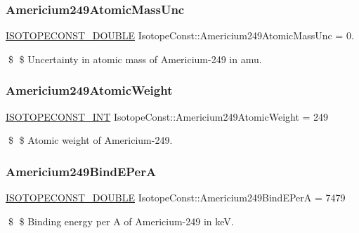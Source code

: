 \subsubsection{\texorpdfstring{Americium249\+Atomic\+Mass\+Unc}{Americium249AtomicMassUnc}}
{\footnotesize\ttfamily \mbox{\hyperlink{group___isotope_const-_macros_ga8f45a7272ce02c0b4c65c44636ed719a}{I\+S\+O\+T\+O\+P\+E\+C\+O\+N\+S\+T\+\_\+\+D\+O\+U\+B\+LE}} Isotope\+Const\+::\+Americium249\+Atomic\+Mass\+Unc = 0.}

\$ \$ Uncertainty in atomic mass of Americium-\/249 in amu. \mbox{\label{group___isotope_const-_americium-_am249_ga90484d532dc5cfd1f79ecb9f25460d8e}} 
\subsubsection{\texorpdfstring{Americium249\+Atomic\+Weight}{Americium249AtomicWeight}}
{\footnotesize\ttfamily \mbox{\hyperlink{group___isotope_const-_macros_ga5f18360b3e99483a35c32d789e62621c}{I\+S\+O\+T\+O\+P\+E\+C\+O\+N\+S\+T\+\_\+\+I\+NT}} Isotope\+Const\+::\+Americium249\+Atomic\+Weight = 249}

\$ \$ Atomic weight of Americium-\/249. \mbox{\label{group___isotope_const-_americium-_am249_ga1479037758f6b76273068c9456b442ae}} 
\subsubsection{\texorpdfstring{Americium249\+Bind\+E\+PerA}{Americium249BindEPerA}}
{\footnotesize\ttfamily \mbox{\hyperlink{group___isotope_const-_macros_ga8f45a7272ce02c0b4c65c44636ed719a}{I\+S\+O\+T\+O\+P\+E\+C\+O\+N\+S\+T\+\_\+\+D\+O\+U\+B\+LE}} Isotope\+Const\+::\+Americium249\+Bind\+E\+PerA = 7479}

\$ \$ Binding energy per A of Americium-\/249 in keV. \mbox{\label{group___isotope_const-_americium-_am249_gad5111cb01b55b04943c69bb1e3f70b6a}} 
